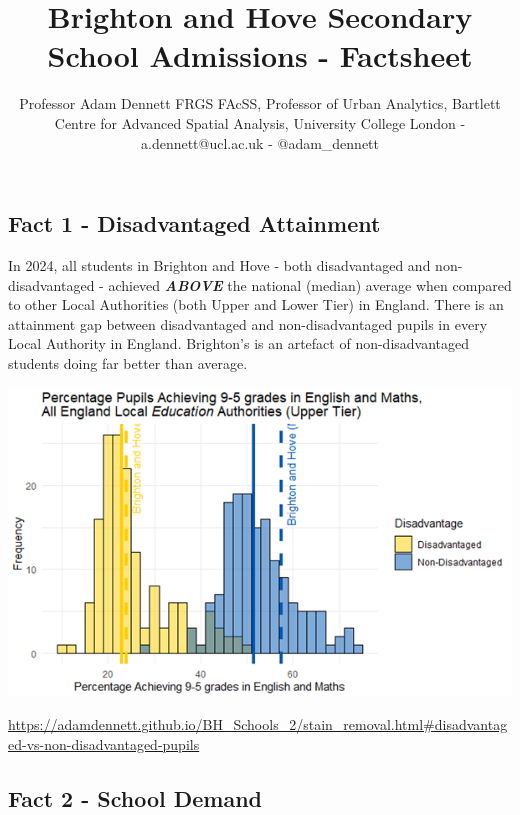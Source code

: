 \documentclass[
  letterpaper,
  DIV=11,
  numbers=noendperiod]{scrartcl}
\title{Brighton and Hove Secondary School Admissions - Factsheet}
\author{Professor Adam Dennett FRGS FAcSS, Professor of Urban Analytics,
Bartlett Centre for Advanced Spatial Analysis, University College London
- a.dennett@ucl.ac.uk - @adam\_dennett}
\date{}
\begin{document}
\maketitle
\ifdefined\Shaded\renewenvironment{Shaded}{\begin{tcolorbox}[borderline west={3pt}{0pt}{shadecolor}, boxrule=0pt, interior hidden, breakable, enhanced, frame hidden, sharp corners]}{\end{tcolorbox}}\fi

\hypertarget{fact-1---disadvantaged-attainment}{%
\subsection{Fact 1 - Disadvantaged
Attainment}\label{fact-1---disadvantaged-attainment}}

In 2024, all students in Brighton and Hove - both disadvantaged and
non-disadvantaged - achieved \textbf{\emph{ABOVE}} the national (median)
average when compared to other Local Authorities (both Upper and Lower
Tier) in England. There is an attainment gap between disadvantaged and
non-disadvantaged pupils in every Local Authority in England. Brighton's
is an artefact of non-disadvantaged students doing far better than
average.

\includegraphics{images/attainmentgap_95.png}

\url{https://adamdennett.github.io/BH_Schools_2/stain_removal.html\#disadvantaged-vs-non-disadvantaged-pupils}

\hypertarget{fact-2---school-demand}{%
\subsection{Fact 2 - School Demand}\label{fact-2---school-demand}}
\end{document}
